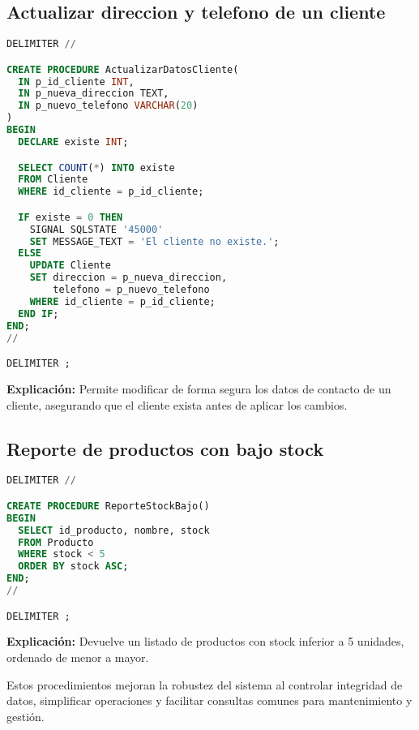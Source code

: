 \subsection{Actualizar direccion y telefono de un cliente}
\begin{lstlisting}[language=SQL]
DELIMITER //

CREATE PROCEDURE ActualizarDatosCliente(
  IN p_id_cliente INT,
  IN p_nueva_direccion TEXT,
  IN p_nuevo_telefono VARCHAR(20)
)
BEGIN
  DECLARE existe INT;

  SELECT COUNT(*) INTO existe
  FROM Cliente
  WHERE id_cliente = p_id_cliente;

  IF existe = 0 THEN
    SIGNAL SQLSTATE '45000'
    SET MESSAGE_TEXT = 'El cliente no existe.';
  ELSE
    UPDATE Cliente
    SET direccion = p_nueva_direccion,
        telefono = p_nuevo_telefono
    WHERE id_cliente = p_id_cliente;
  END IF;
END;
//

DELIMITER ;
\end{lstlisting}
\textbf{Explicaci\'on:} Permite modificar de forma segura los datos de contacto de un cliente, asegurando que el cliente exista antes de aplicar los cambios.

\subsection{Reporte de productos con bajo stock}
\begin{lstlisting}[language=SQL]
DELIMITER //

CREATE PROCEDURE ReporteStockBajo()
BEGIN
  SELECT id_producto, nombre, stock
  FROM Producto
  WHERE stock < 5
  ORDER BY stock ASC;
END;
//

DELIMITER ;
\end{lstlisting}
\textbf{Explicaci\'on:} Devuelve un listado de productos con stock inferior a 5 unidades, ordenado de menor a mayor.

\bigskip
Estos procedimientos mejoran la robustez del sistema al controlar integridad de datos, simplificar operaciones y facilitar consultas comunes para mantenimiento y gesti\'on.
